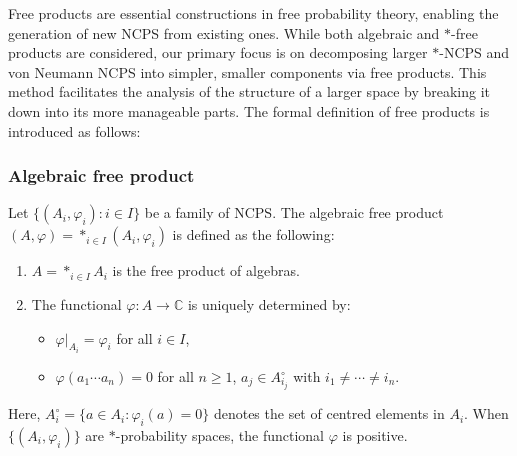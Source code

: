 Free products are essential constructions in free probability theory, enabling the generation of new NCPS from existing ones. While both algebraic and $*$-free products are considered, our primary focus is on decomposing larger $*$-NCPS and von Neumann NCPS into simpler, smaller components via free products. This method facilitates the analysis of the structure of a larger space by breaking it down into its more manageable parts. The formal definition of free products is introduced as follows:

\subsubsection{Algebraic free product}

Let $\{(A_i, \varphi_i) : i \in I\}$ be a family of NCPS. The algebraic free product $(A, \varphi) = *_{i \in I} (A_i, \varphi_i)$ is defined as the following:

\begin{enumerate}
    \item $A = *_{i \in I} A_i$ is the free product of algebras.
    
    \item The functional $\varphi : A \to \mathbb{C}$ is uniquely determined by:
        \begin{itemize}
            \item $\varphi|_{A_i} = \varphi_i$ for all $i \in I$,
            \item $\varphi(a_1 \cdots a_n) = 0$ for all $n \geq 1$, $a_j \in A_{i_j}^{\circ}$ with $i_1 \neq \cdots \neq i_n$.
        \end{itemize}
\end{enumerate}

Here, $A_i^{\circ} = \{a \in A_i : \varphi_i(a) = 0\}$ denotes the set of centred elements in $A_i$. When $\{(A_i, \varphi_i)\}$ are $*$-probability spaces, the functional $\varphi$ is positive.

\begin{comment}
\subsubsection{$*$-free product}

For $*$-probability spaces $\{(A_i, \varphi_i) : i \in I\}$, the $*$-free product $(A, \varphi) = *_{i \in I} (A_i, \varphi_i)$ is constructed as follows:

\begin{enumerate}
    \item $A = *_{i \in I} A_i$, the free product of $*$-algebras.
    \item The state $\varphi : A \to \mathbb{C}$ is defined similarly to the algebraic case. An additional property of $\varphi$ is its positivity, which arises naturally given that each $\varphi_i$ is positive.
\end{enumerate}
\end{comment}

